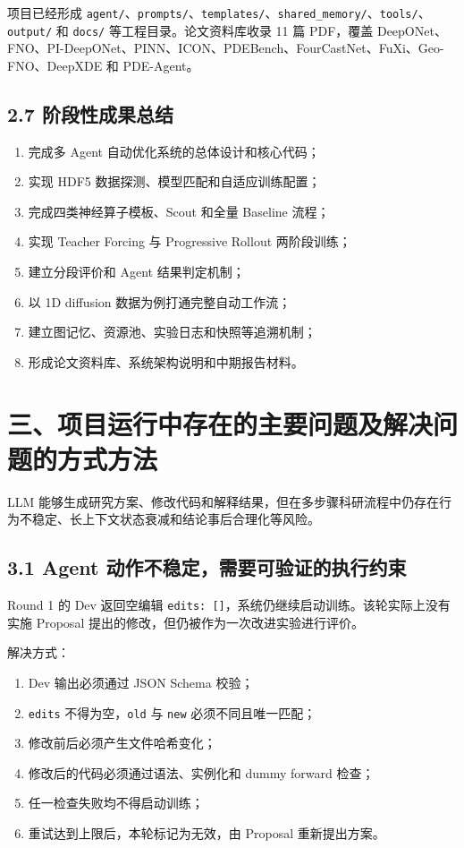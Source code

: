 \documentclass[UTF8,a4paper,zihao=-4]{ctexart}
\begin{document}
项目已经形成 \texttt{agent/}、\texttt{prompts/}、\texttt{templates/}、\texttt{shared\_memory/}、\texttt{tools/}、\texttt{output/} 和 \texttt{docs/} 等工程目录。论文资料库收录 11 篇 PDF，覆盖 DeepONet、FNO、PI-DeepONet、PINN、ICON、PDEBench、FourCastNet、FuXi、Geo-FNO、DeepXDE 和 PDE-Agent。

\subsection*{2.7 阶段性成果总结}

\begin{enumerate}[leftmargin=2em]
\item 完成多 Agent 自动优化系统的总体设计和核心代码；
\item 实现 HDF5 数据探测、模型匹配和自适应训练配置；
\item 完成四类神经算子模板、Scout 和全量 Baseline 流程；
\item 实现 Teacher Forcing 与 Progressive Rollout 两阶段训练；
\item 建立分段评价和 Agent 结果判定机制；
\item 以 1D diffusion 数据为例打通完整自动工作流；
\item 建立图记忆、资源池、实验日志和快照等追溯机制；
\item 形成论文资料库、系统架构说明和中期报告材料。
\end{enumerate}

\section*{三、项目运行中存在的主要问题及解决问题的方式方法}

LLM 能够生成研究方案、修改代码和解释结果，但在多步骤科研流程中仍存在行为不稳定、长上下文状态衰减和结论事后合理化等风险。

\subsection*{3.1 Agent 动作不稳定，需要可验证的执行约束}

Round 1 的 Dev 返回空编辑 \texttt{edits: []}，系统仍继续启动训练。该轮实际上没有实施 Proposal 提出的修改，但仍被作为一次改进实验进行评价。

解决方式：

\begin{enumerate}[leftmargin=2em]
\item Dev 输出必须通过 JSON Schema 校验；
\item \texttt{edits} 不得为空，\texttt{old} 与 \texttt{new} 必须不同且唯一匹配；
\item 修改前后必须产生文件哈希变化；
\item 修改后的代码必须通过语法、实例化和 dummy forward 检查；
\item 任一检查失败均不得启动训练；
\item 重试达到上限后，本轮标记为无效，由 Proposal 重新提出方案。
\end{enumerate}
\end{document}
